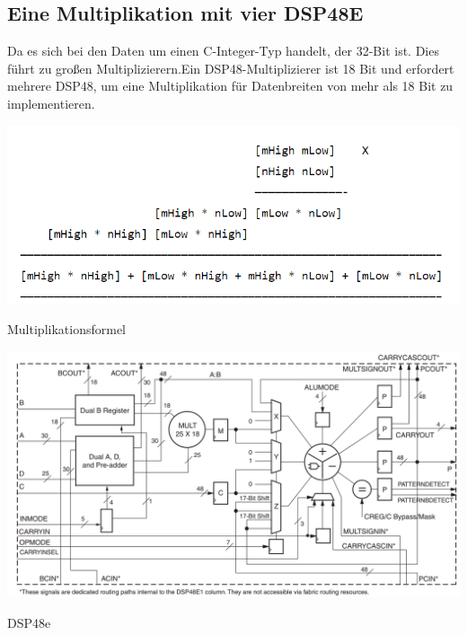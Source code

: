 \subsection {Eine Multiplikation
mit vier DSP48E}
Da es sich bei den Daten um einen C-Integer-Typ handelt, der 32-Bit ist. Dies führt zu großen Multiplizierern.Ein DSP48-Multiplizierer ist 18 Bit und erfordert mehrere DSP48, um eine Multiplikation für Datenbreiten von mehr als 18 Bit zu implementieren.\\

\begin{minipage}{\textwidth}
    \begin{center}        
        \includegraphics[scale=0.7]{img/split32bits_4dsp.png} 
    \end{center}
\end{minipage}
\begin{center}
Multiplikationsformel
\end{center}

\begin{minipage}{\textwidth}
    \begin{center}        
        \includegraphics[scale=0.4]{img/DSP48e.png} 
    \end{center}
\end{minipage}
\begin{center}
DSP48e
\end{center}



